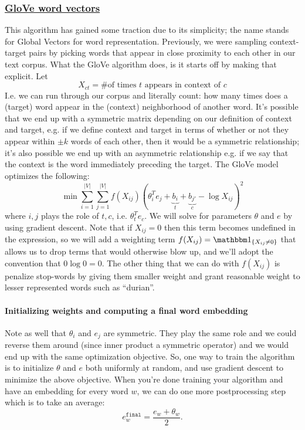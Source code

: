 \documentclass[12pt]{article}
\begin{document}
\subsubsection{\href{https://nlp.stanford.edu/pubs/glove.pdf}{GloVe word vectors}} This algorithm has gained some traction due to its simplicity; the name stands for Global Vectors for word representation. Previously, we were sampling context-target pairs by picking words that appear in close proximity to each other in our text corpus. What the GloVe algorithm does, is it starts off by making that explicit. Let
\[
  X_{ct} = \textrm{\# of times $t$ appears in context of $c$}
\]
I.e. we can run through our corpus and literally count: how many times does a (target) word appear in the (context) neighborhood of another word. It's possible that we end up with a symmetric matrix depending on our definition of context and target, e.g. if we define context and target in terms of whether or not they appear within $\pm k$ words of each other, then it would be a symmetric relationship; it's also possible we end up with an asymmetric relationship e.g. if we say that the context is the word immediately preceding the target. The GloVe model optimizes the following:
\[
  \min \sum_{i=1}^{|V|} \sum_{j=1}^{|V|} f(X_{ij}) \left(\theta_i^T e_j + \underbrace{b_i}_{t} + \underbrace{b_{j'}}_{c} - \log X_{ij}\right)^2
\]
where $i,j$ plays the role of $t,c$, i.e. $\theta_t^T e_c$. We will solve for parameters $\theta$ and $e$ by using gradient descent. Note that if $X_{ij} = 0$ then this term becomes undefined in the expression, so we will add a weighting term $f(X_{ij}) = \mathbbm 1_{\{X_{ij} \neq 0\}}$ that allows us to drop terms that would otherwise blow up, and we'll adopt the convention that $0 \log 0 = 0$. The other thing that we can do with $f(X_{ij})$ is penalize stop-words by giving them smaller weight and grant reasonable weight to lesser represented words such as ``durian''.

\paragraph{Initializing weights and computing a final word embedding}
Note as well that $\theta_i$ and $e_j$ are symmetric. They play the same role and we could reverse them around (since inner product a symmetric operator) and we would end up with the same optimization objective. So, one way to train the algorithm is to initialize $\theta$ and $e$ both uniformly at random, and use gradient descent to minimize the above objective. When you're done training your algorithm and have an embedding for every word $w$, we can do one more postprocessing step which is to take an average:
\[
  e_w^{\texttt{final}} = \frac{e_w + \theta_w}{2}.
\]
\end{document}
